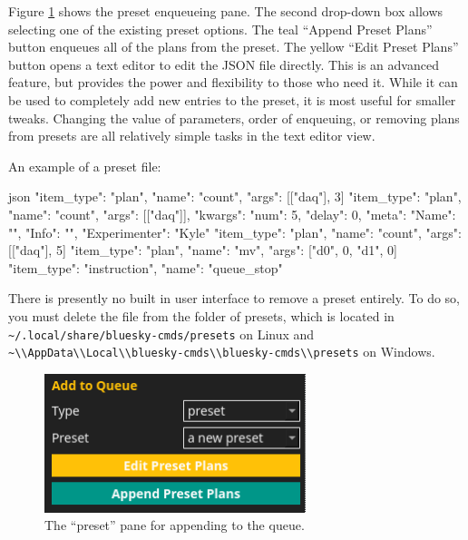 Figure \ref{acq:fig:preset} shows the preset enqueueing pane.
The second drop-down box allows selecting one of the existing preset options.
The teal ``Append Preset Plans'' button enqueues all of the plans from the preset.
The yellow ``Edit Preset Plans'' button opens a text editor to edit the JSON file directly.
This is an advanced feature, but provides the power and flexibility to those who need it.
While it can be used to completely add new entries to the preset, it is most useful for smaller tweaks.
Changing the value of parameters, order of enqueuing, or removing plans from presets are all relatively simple tasks in the text editor view.

An example of a preset file:

\begin{codefragment}{json}
\noop
{"item_type": "plan", "name": "count", "args": [["daq"], 3]}
{"item_type": "plan", "name": "count", "args": [["daq"]], "kwargs": {"num": 5, "delay": 0}, "meta": {"Name": "", "Info": "", "Experimenter": "Kyle"}}
{"item_type": "plan", "name": "count", "args": [["daq"], 5]}
{"item_type": "plan", "name": "mv", "args": ["d0", 0, "d1", 0]}
{"item_type": "instruction", "name": "queue_stop"}

\end{codefragment}

There is presently no built in user interface to remove a preset entirely.
To do so, you must delete the file from the folder of presets, which is located in \nolinkurl{~/.local/share/bluesky-cmds/presets} on Linux and \nolinkurl{\~\\AppData\\Local\\bluesky-cmds\\bluesky-cmds\\presets} on Windows.


\begin{figure}
\includegraphics[width=3in]{"acquisition/images/preset"}
\caption[Preset Pane]{
	The ``preset'' pane for appending to the queue.
}
\label{acq:fig:preset}
\end{figure}

